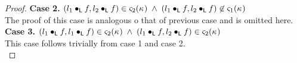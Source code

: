 \begin{lemma}[]
\begin{proof}
%
%
%
%
%

\noindent\textbf{Case 2.} $(l_1 \bullet_{\textsf{L}} f, l_2 \bullet_{\textsf{L}} f) \in \varsigma_{2}(\kappa_{}) \;\land\; (l_1 \bullet_{\textsf{L}} f, l_2 \bullet_{\textsf{L}} f) \not\in \varsigma_{1}(\kappa_{})$\\
The proof of this case is analogous o that of previous case and is omitted here.\\

\noindent\textbf{Case 3.} $(l_1 \bullet_{\textsf{L}} f, l_1 \bullet_{\textsf{L}} f) \in \varsigma_{2}(\kappa_{}) \;\land\; (l_1 \bullet_{\textsf{L}} f, l_2 \bullet_{\textsf{L}} f) \in \varsigma_{2}(\kappa_{})$\\
This case follows trivially from case 1 and case 2. \\


\end{proof}
\end{lemma}
%
%
